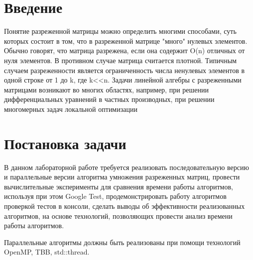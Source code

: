 \documentclass{report}
\begin{document}
\setcounter{page}{2}

\tableofcontents
\newpage

\section*{Введение}
\par Понятие разреженной матрицы можно определить многими способами, суть которых состоит в том, что в разреженной матрице "много" нулевых элементов. Обычно говорят, что матрица разрежена, если она содержит O(n) отличных от нуля элементов. В противном случае матрица считается плотной. Типичным случаем разреженности является ограниченность числа ненулевых элементов в одной строке от 1 до k, где k<<n. Задачи линейной алгебры с разреженными матрицами возникают во многих областях, например, при решении дифференциальных уравнений в частных производных, при решении многомерных задач локальной оптимизации
\newpage

\section*{Постановка задачи}
\par В данном лабораторной работе требуется реализовать последовательную версию и параллельные версии алгоритма умножения разреженных матриц, провести вычислительные эксперименты для сравнения времени работы алгоритмов, используя при этом Google Test, продемонстрировать работу алгоритмов проверкой тестов в консоли, сделать выводы об эффективности реализованных алгоритмов, на основе технологий, позволяющих провести анализ времени работы алгоритмов.
\par Параллельные алгоритмы должны быть реализованы при помощи технологий OpenMP, TBB, std::thread.
\newpage

\end{document}
